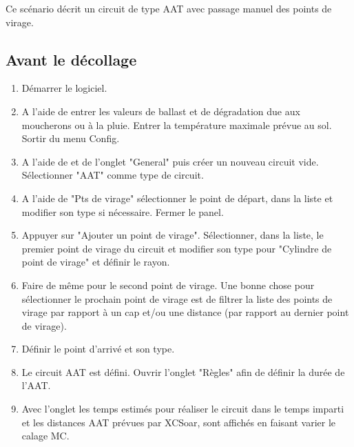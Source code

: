 Ce scénario décrit un circuit de type AAT avec passage manuel des points de virage.

\subsection*{Avant le décollage}
\begin{enumerate}
\item  Démarrer le logiciel.
\item  A l'aide de \blink{}entrer les valeurs de ballast et de dégradation due aux moucherons ou à la pluie. Entrer la température maximale prévue au sol. Sortir du menu Config.
\item  A l'aide de \blink{}et de l'onglet "General" puis créer un nouveau circuit vide. Sélectionner "AAT"  comme type de circuit.
\item A l'aide de "Pts de virage" sélectionner le point de départ, dans la liste et modifier son type si nécessaire. Fermer le panel.
\item Appuyer sur "Ajouter un point de virage". Sélectionner, dans la liste, le premier point de virage du circuit et modifier son type pour "Cylindre de point de virage" et définir le rayon.
\item Faire de même pour le second point de virage. Une bonne chose pour sélectionner le prochain point de virage est de filtrer la liste des points de virage par rapport à un cap et/ou une distance (par rapport au dernier point de virage).
\item  Définir le point d'arrivé et son type.
\item Le circuit AAT est défini. Ouvrir l'onglet "Règles" afin de définir la durée de l'AAT.
\item Avec l'onglet  les temps estimés pour réaliser le circuit dans le temps imparti et les distances AAT prévues par XCSoar, sont affichés en faisant varier le calage MC.
\end{enumerate}

